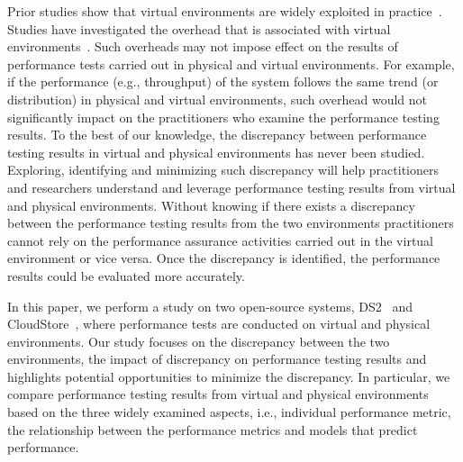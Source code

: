 Prior studies show that virtual environments are widely exploited in practice~\cite{Cito:2015:MCA:2786805.2786826,Nguyen:2012:ADP:2188286.2188344,xiong2013vperfguard}. Studies have investigated the overhead that is associated with virtual environments~\cite{menon2005diagnosing}. Such overheads may not impose effect on the results of performance tests carried out in physical and virtual environments. For example, if the performance (e.g., throughput) of the system follows the same trend (or distribution) in physical and virtual environments, such overhead would not significantly impact on the practitioners who examine the performance testing results. To the best of our knowledge, the discrepancy between performance testing results in virtual and physical environments has never been studied. Exploring, identifying and minimizing such discrepancy will help practitioners and researchers understand and leverage performance testing results from virtual and physical environments. Without knowing if there exists a discrepancy between the performance testing results from the two environments practitioners cannot rely on the performance assurance activities carried out in the virtual environment or vice versa. Once the discrepancy is identified, the performance results could be evaluated more accurately.






In this paper, we perform a study on two open-source systems, DS2~\cite{delldvd} and CloudStore~\cite{cloudstore}, where performance tests are conducted on virtual and physical environments. Our study focuses on the discrepancy between the two environments, the impact of discrepancy on performance testing results and highlights potential opportunities to minimize the discrepancy. In particular, we compare performance testing results from virtual and physical environments based on the three widely examined aspects, i.e., individual performance metric, the relationship between the performance metrics and models that predict performance. 

